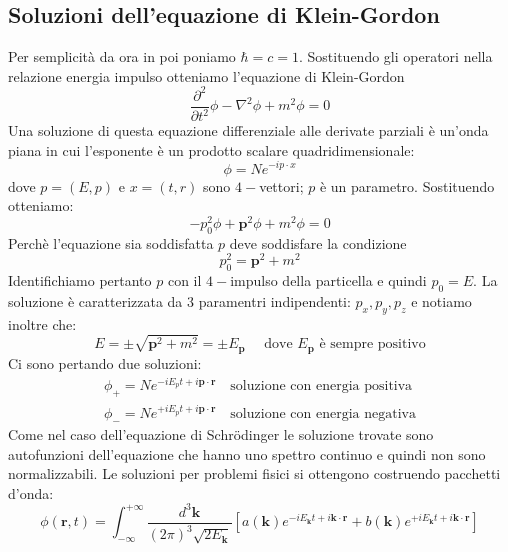 \subsection{Soluzioni dell'equazione di Klein-Gordon}
Per semplicità da ora in poi poniamo $\hbar=c=1$. Sostituendo gli operatori nella relazione energia impulso otteniamo l'equazione di Klein-Gordon
\begin{equation}
    \frac{\partial^2}{\partial t^2}\phi - \nabla^2\phi + m^2\phi = 0
    \label{eq:KG}
\end{equation}
Una soluzione di questa equazione differenziale alle derivate parziali è un'onda piana in cui l'esponente è un prodotto scalare quadridimensionale:
\begin{equation}
    \phi=Ne^{-ip\cdot x}
\end{equation}
dove $p=(E,p)$ e $x=(t,r)$ sono $4-$vettori; $p$ è un parametro. Sostituendo otteniamo:
\begin{equation*}
    -p_0^2\phi+\mathbf{p}^2\phi+m^2\phi=0
\end{equation*}
Perchè l'equazione sia soddisfatta $p$ deve soddisfare la condizione 
\begin{equation*}
    p_0^2=\mathbf{p}^2+m^2
\end{equation*}
Identifichiamo pertanto $p$ con il $4-$impulso della particella e quindi $p_0=E$. La soluzione è caratterizzata da $3$ paramentri indipendenti: $p_x, p_y,p_z$ e notiamo inoltre che:
\begin{equation*}
    E=\pm\sqrt{\mathbf{p}^2+m^2}=\pm E_\mathbf{p} \quad\text{ dove } E_\mathbf{p} \text{ è sempre positivo}
\end{equation*}
Ci sono pertando due soluzioni:
\begin{align*}
    \phi_+ = Ne^{-iE_p t + i\mathbf{p} \cdot \mathbf{r}} \quad \text{soluzione con energia positiva} \\
\phi_- = Ne^{+iE_p t + i\mathbf{p} \cdot \mathbf{r}} \quad \text{soluzione con energia negativa}
\end{align*}
Come nel caso dell'equazione di Schr\"odinger le soluzione trovate sono autofunzioni dell'equazione che hanno uno spettro continuo e quindi non sono normalizzabili. Le soluzioni per problemi fisici si ottengono costruendo pacchetti d'onda:
\begin{equation}
    \phi(\mathbf{r}, t)=\int_{-\infty}^{+\infty} \frac{d^3 \mathbf{k}}{(2 \pi)^3 \sqrt{2 E_{\mathbf{k}}}}\left[a(\mathbf{k}) e^{-i E_{\mathbf{k}} t+i \mathbf{k} \cdot \mathbf{r}}+b(\mathbf{k}) e^{+i E_{\mathbf{k}} t+i \mathbf{k} \cdot \mathbf{r}}\right]
\end{equation}
